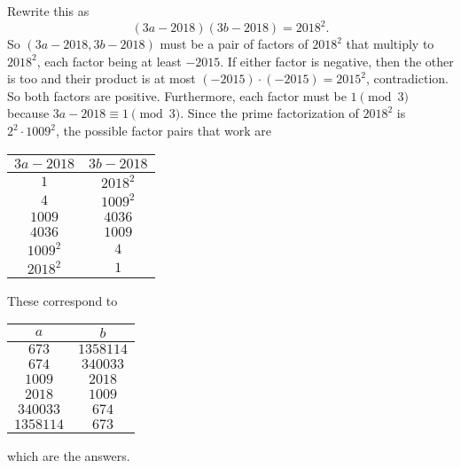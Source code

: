 Rewrite this as \[\left(3a-2018\right)\left(3b-2018\right)=2018^2.\] So $\left(3a-2018,3b-2018\right)$ must be a pair of factors of $2018^2$ that multiply to $2018^2$, each factor being at least $-2015$. If either factor is negative, then the other is too and their product is at most $\left(-2015\right)\cdot\left(-2015\right)=2015^2$, contradiction. So both factors are positive. Furthermore, each factor must be $1\pmod3$ because $3a-2018\equiv1\pmod3$. Since the prime factorization of $2018^2$ is $2^2\cdot1009^2$, the possible factor pairs that work are
\begin{center}
	\begin{tabular}{c|c}
		$3a-2018$ & $3b-2018$ \\\hline
		$1$ & $2018^2$ \\
		$4$ & $1009^2$ \\
		$1009$ & $4036$ \\
		$4036$ & $1009$ \\
		$1009^2$ & $4$ \\
		$2018^2$ & $1$
	\end{tabular}
\end{center}
These correspond to
\begin{center}
	\begin{tabular}{c|c}
		$a$ & $b$ \\\hline
		$673$ & $1358114$ \\
		$674$ & $340033$ \\
		$1009$ & $2018$ \\
		$2018$ & $1009$ \\
		$340033$ & $674$ \\
		$1358114$ & $673$
	\end{tabular}
\end{center}
which are the answers.